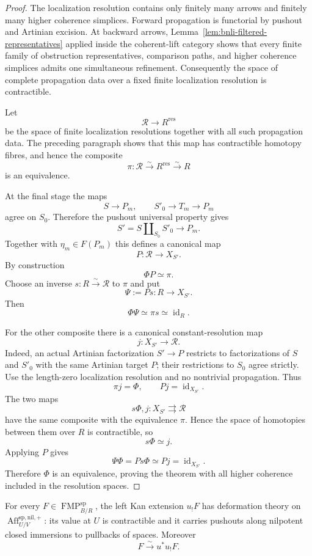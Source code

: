 \begin{proof}
The localization resolution contains only finitely many arrows and finitely
many higher coherence simplices.  Forward propagation is functorial by
pushout and Artinian excision.  At backward arrows,
Lemma~\ref{lem:bnli-filtered-representatives} applied inside the coherent-lift
category shows that every finite family of obstruction representatives,
comparison paths, and higher coherence simplices admits one simultaneous
refinement.  Consequently the space of complete propagation data over a fixed
finite localization resolution is contractible.

Let
\[
    \mathscr R\longrightarrow R^{\mathrm{res}}
\]
be the space of finite localization resolutions together with all such
propagation data.  The preceding paragraph shows that this map has
contractible homotopy fibres, and hence the composite
\[
\boxed{
    \pi:\mathscr R\xrightarrow{\sim}R^{\mathrm{res}}
    \xrightarrow{\sim}R}
\]
is an equivalence.

At the final stage the maps
\[
    S\longrightarrow P_m,
    \qquad
    S'_0\longrightarrow T_m\longrightarrow P_m
\]
agree on $S_0$.  Therefore the pushout universal property gives
\[
    S'=S\amalg_{S_0}S'_0\longrightarrow P_m.
\]
Together with $\eta_m\in F(P_m)$ this defines a canonical map
\[
    P:\mathscr R\longrightarrow X_{S'}.
\]
By construction
\[
\boxed{
    \Phi P\simeq\pi.}
\]
Choose an inverse $s:R\xrightarrow{\sim}\mathscr R$ to $\pi$ and put
\[
    \Psi:=Ps:R\longrightarrow X_{S'}.
\]
Then
\[
    \Phi\Psi\simeq\pi s\simeq\operatorname{id}_R.
\]

For the other composite there is a canonical constant-resolution map
\[
    j:X_{S'}\longrightarrow\mathscr R.
\]
Indeed, an actual Artinian factorization $S'\to P$ restricts to factorizations
of $S$ and $S'_0$ with the same Artinian target $P$; their restrictions to
$S_0$ agree strictly.  Use the length-zero localization resolution and no
nontrivial propagation.  Thus
\[
    \pi j=\Phi,
    \qquad
    Pj=\operatorname{id}_{X_{S'}}.
\]
The two maps
\[
    s\Phi,j:X_{S'}\rightrightarrows\mathscr R
\]
have the same composite with the equivalence $\pi$.  Hence the space of
homotopies between them over $R$ is contractible, so
\[
    s\Phi\simeq j.
\]
Applying $P$ gives
\[
    \Psi\Phi
    =Ps\Phi
    \simeq
    Pj
    =
    \operatorname{id}_{X_{S'}}.
\]
Therefore $\Phi$ is an equivalence, proving the theorem with all higher
coherence included in the resolution spaces.
\end{proof}

\begin{theorem}
\label{thm:bnli-nil-kan-deformation}
For every $F\in\operatorname{FMP}^{\mathrm{sp}}_{B/R}$, the left Kan
extension $u_!F$ has deformation theory on
$\operatorname{Aff}^{\mathrm{sp,nil,+}}_{U/V}$: its value at $U$ is
contractible and it carries pushouts along nilpotent closed immersions to
pullbacks of spaces.  Moreover
\[
\boxed{
    F\xrightarrow{\sim}u^*u_!F.}
\]
\end{theorem}

